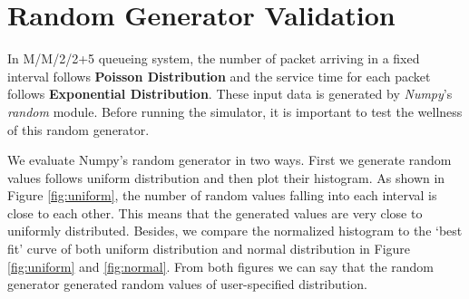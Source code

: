 \documentclass[12pt]{article}  %
\theoremstyle{definition}
\theoremstyle{remark}
\begin{document}
\section{Random Generator Validation}
In M/M/2/2+5 queueing system, the number of packet arriving in a fixed interval follows \textbf{Poisson Distribution} and the service time for each packet follows \textbf{Exponential Distribution}.
These input data is generated by \textit{Numpy}'s \textit{random} module. Before running the simulator, it is important to test the wellness of this random generator.

We evaluate Numpy's random generator in two ways. First we generate random values follows uniform distribution and then plot their histogram.
As shown in Figure \ref{fig:uniform}, the number of random values falling into each interval is close to each other.
This means that the generated values are very close to uniformly distributed.
Besides, we compare the normalized histogram to the `best fit' curve of both uniform distribution and normal distribution in Figure \ref{fig:uniform} and \ref{fig:normal}.
From both figures we can say that the random generator generated random values of user-specified distribution.
\end{document}

